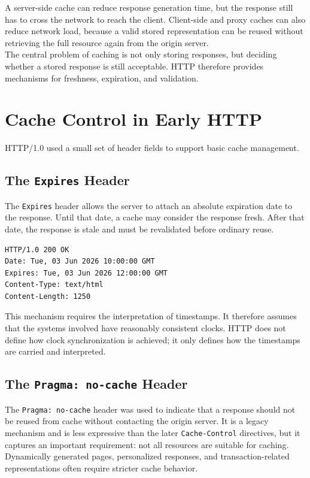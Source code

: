 \documentclass{scrbook}
\begin{document}
A server-side cache can reduce response generation time, but the response still has to cross the network to reach the client. Client-side and proxy caches can also reduce network load, because a valid stored representation can be reused without retrieving the full resource again from the origin server.\\

The central problem of caching is not only storing responses, but deciding whether a stored response is still acceptable. HTTP therefore provides mechanisms for freshness, expiration, and validation.

\section{Cache Control in Early HTTP}

HTTP/1.0 used a small set of header fields to support basic cache management.

\subsection{The \texttt{Expires} Header}

The \texttt{Expires} header allows the server to attach an absolute expiration date to the response. Until that date, a cache may consider the response fresh. After that date, the response is stale and must be revalidated before ordinary reuse.

\begin{lstlisting}
HTTP/1.0 200 OK
Date: Tue, 03 Jun 2026 10:00:00 GMT
Expires: Tue, 03 Jun 2026 12:00:00 GMT
Content-Type: text/html
Content-Length: 1250
\end{lstlisting}

This mechanism requires the interpretation of timestamps. It therefore assumes that the systems involved have reasonably consistent clocks. HTTP does not define how clock synchronization is achieved; it only defines how the timestamps are carried and interpreted.

\subsection{The \texttt{Pragma: no-cache} Header}

The \texttt{Pragma: no-cache} header was used to indicate that a response should not be reused from cache without contacting the origin server. It is a legacy mechanism and is less expressive than the later \texttt{Cache-Control} directives, but it captures an important requirement: not all resources are suitable for caching. Dynamically generated pages, personalized responses, and transaction-related representations often require stricter cache behavior.
\end{document}
